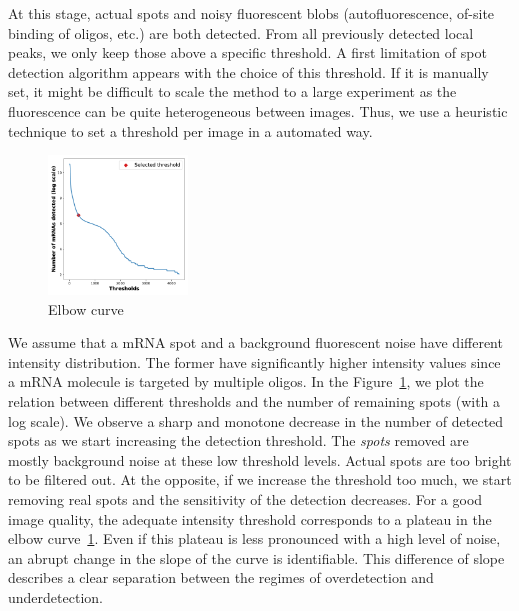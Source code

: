 At this stage, actual spots and noisy fluorescent blobs (autofluorescence, of-site binding of oligos, etc.) are both detected.
From all previously detected local peaks, we only keep those above a specific threshold.
A first limitation of spot detection algorithm appears with the choice of this threshold.
If it is manually set, it might be difficult to scale the method to a large experiment as the fluorescence can be quite heterogeneous between images.
Thus, we use a heuristic technique to set a threshold per image in a automated way.

\begin{figure}
	\begin{center}
		\includegraphics[width=0.33\textwidth]{figures/chapter2/elbow_curve_real}
	\caption{Elbow curve}
	\label{fig:elbow_detection}
	\end{center}
\end{figure}

We assume that a \ac{mRNA} spot and a background fluorescent noise have different intensity distribution.
The former have significantly higher intensity values since a \ac{mRNA} molecule is targeted by multiple oligos.
In the Figure~\ref{fig:elbow_detection}, we plot the relation between different thresholds and the number of remaining spots (with a log scale).
We observe a sharp and monotone decrease in the number of detected spots as we start increasing the detection threshold.
The \emph{spots} removed are mostly background noise at these low threshold levels.
Actual spots are too bright to be filtered out.
At the opposite, if we increase the threshold too much, we start removing real spots and the sensitivity of the detection decreases.
For a good image quality, the adequate intensity threshold corresponds to a plateau in the elbow curve~\ref{fig:elbow_detection}.
Even if this plateau is less pronounced with a high level of noise, an abrupt change in the slope of the curve is identifiable.
This difference of slope describes a clear separation between the regimes of overdetection and underdetection.

